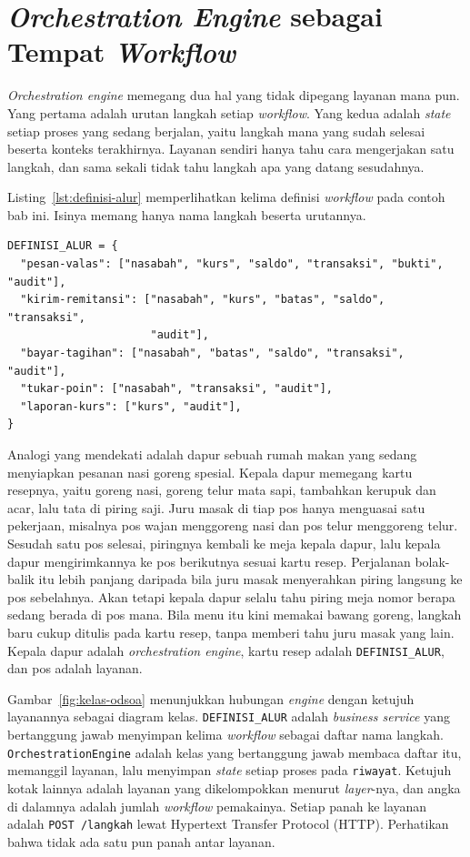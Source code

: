 \section{\textit{Orchestration Engine} sebagai Tempat \textit{Workflow}}

\textit{Orchestration engine} memegang dua hal yang tidak dipegang layanan mana pun. Yang
pertama adalah urutan langkah setiap \textit{workflow}. Yang kedua adalah \textit{state}
setiap proses yang sedang berjalan, yaitu langkah mana yang sudah selesai
beserta konteks terakhirnya. Layanan sendiri hanya tahu cara mengerjakan satu
langkah, dan sama sekali tidak tahu langkah apa yang datang sesudahnya.

Listing~\ref{lst:definisi-alur} memperlihatkan kelima definisi \textit{workflow} pada
contoh bab ini. Isinya memang hanya nama langkah beserta urutannya.

\begin{lstlisting}[style=PythonStyle, caption={Definisi kelima \textit{workflow},
  tersedia di \berkas{sources/chapter12/orkestrator.py}},
  label=lst:definisi-alur]
DEFINISI_ALUR = {
  "pesan-valas": ["nasabah", "kurs", "saldo", "transaksi", "bukti", "audit"],
  "kirim-remitansi": ["nasabah", "kurs", "batas", "saldo", "transaksi",
                      "audit"],
  "bayar-tagihan": ["nasabah", "batas", "saldo", "transaksi", "audit"],
  "tukar-poin": ["nasabah", "transaksi", "audit"],
  "laporan-kurs": ["kurs", "audit"],
}
\end{lstlisting}

Analogi yang mendekati adalah dapur sebuah rumah makan yang sedang
menyiapkan pesanan nasi goreng spesial. Kepala dapur memegang kartu resepnya,
yaitu goreng nasi, goreng telur mata sapi, tambahkan kerupuk dan acar, lalu tata
di piring saji. Juru masak di tiap pos hanya menguasai satu pekerjaan, misalnya
pos wajan menggoreng nasi dan pos telur menggoreng telur. Sesudah satu pos
selesai, piringnya kembali ke meja kepala dapur, lalu kepala dapur
mengirimkannya ke pos berikutnya sesuai kartu resep. Perjalanan bolak-balik itu
lebih panjang daripada bila juru masak menyerahkan piring langsung ke pos
sebelahnya. Akan tetapi kepala dapur selalu tahu piring meja nomor berapa
sedang berada di pos mana. Bila menu itu kini memakai bawang goreng, langkah
baru cukup ditulis pada kartu resep, tanpa memberi tahu juru masak yang lain.
Kepala dapur adalah \textit{orchestration engine}, kartu resep adalah
\texttt{DEFINISI\_ALUR}, dan pos adalah layanan.

Gambar~\ref{fig:kelas-odsoa} menunjukkan hubungan \textit{engine} dengan ketujuh
layanannya sebagai diagram kelas. \texttt{DEFINISI\_ALUR} adalah
\textit{business service} yang bertanggung jawab menyimpan kelima
\textit{workflow} sebagai daftar nama langkah. \texttt{OrchestrationEngine}
adalah kelas yang bertanggung jawab membaca daftar itu, memanggil layanan, lalu
menyimpan \textit{state} setiap proses pada \texttt{riwayat}. Ketujuh kotak
lainnya adalah layanan yang dikelompokkan menurut \textit{layer}-nya, dan angka
di dalamnya adalah jumlah \textit{workflow} pemakainya. Setiap panah ke layanan
adalah \texttt{POST /langkah} lewat Hypertext Transfer Protocol (HTTP).
Perhatikan bahwa tidak ada satu pun panah antar layanan.

